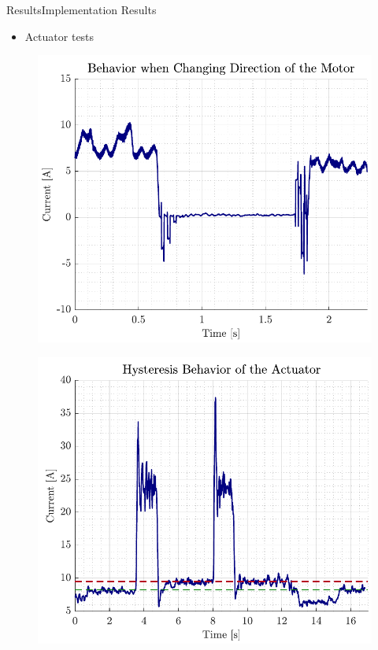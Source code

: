 \begin{frame}{Results}{Implementation Results}
    \begin{itemize}
        \item Actuator tests
    \end{itemize}
    \begin{minipage}{0.45\linewidth}
        \begin{figure}[H]
            \centering
            \includegraphics[width=1\linewidth]{figures/direction}
        \end{figure}       
    \end{minipage}\hfill      
    \begin{minipage}{0.45\linewidth}
        \begin{figure}[H]
            \centering
            \includegraphics[width=1\linewidth]{figures/hysteresis}
        \end{figure}             
    \end{minipage}\hfill \\    
\end{frame}


